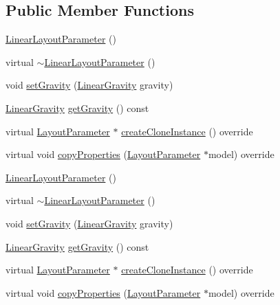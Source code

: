 \subsection*{Public Member Functions}
\begin{DoxyCompactItemize}
\item 
\hyperlink{classui_1_1LinearLayoutParameter_a31ae7f56fcfe826ad8355f654d1e1546}{Linear\+Layout\+Parameter} ()
\item 
virtual \hyperlink{classui_1_1LinearLayoutParameter_a931a53a9e56f1e0dc9527d71928c2fcc}{$\sim$\+Linear\+Layout\+Parameter} ()
\item 
void \hyperlink{classui_1_1LinearLayoutParameter_a5ff8462b69c4e25041cef73621ddc963}{set\+Gravity} (\hyperlink{classui_1_1LinearLayoutParameter_a2045fd6c06860357e95bccdf2531fe08}{Linear\+Gravity} gravity)
\item 
\hyperlink{classui_1_1LinearLayoutParameter_a2045fd6c06860357e95bccdf2531fe08}{Linear\+Gravity} \hyperlink{classui_1_1LinearLayoutParameter_a5950d061c67834f27b76fe3eb272451a}{get\+Gravity} () const
\item 
virtual \hyperlink{classui_1_1LayoutParameter}{Layout\+Parameter} $\ast$ \hyperlink{classui_1_1LinearLayoutParameter_a5f48d9a8e9acb1bea23e15723a3c405a}{create\+Clone\+Instance} () override
\item 
virtual void \hyperlink{classui_1_1LinearLayoutParameter_a8d9e9d1475927a7dcfda3cfe0581f164}{copy\+Properties} (\hyperlink{classui_1_1LayoutParameter}{Layout\+Parameter} $\ast$model) override
\item 
\hyperlink{classui_1_1LinearLayoutParameter_a31ae7f56fcfe826ad8355f654d1e1546}{Linear\+Layout\+Parameter} ()
\item 
virtual \hyperlink{classui_1_1LinearLayoutParameter_a931a53a9e56f1e0dc9527d71928c2fcc}{$\sim$\+Linear\+Layout\+Parameter} ()
\item 
void \hyperlink{classui_1_1LinearLayoutParameter_a5ff8462b69c4e25041cef73621ddc963}{set\+Gravity} (\hyperlink{classui_1_1LinearLayoutParameter_a2045fd6c06860357e95bccdf2531fe08}{Linear\+Gravity} gravity)
\item 
\hyperlink{classui_1_1LinearLayoutParameter_a2045fd6c06860357e95bccdf2531fe08}{Linear\+Gravity} \hyperlink{classui_1_1LinearLayoutParameter_aff9a9ddafe0ba86fb4f196c710d18d98}{get\+Gravity} () const
\item 
virtual \hyperlink{classui_1_1LayoutParameter}{Layout\+Parameter} $\ast$ \hyperlink{classui_1_1LinearLayoutParameter_a90adfb888afd28d7ee8974f5a32afe35}{create\+Clone\+Instance} () override
\item 
virtual void \hyperlink{classui_1_1LinearLayoutParameter_aadf884af74f03c8e31bd832082dfff6f}{copy\+Properties} (\hyperlink{classui_1_1LayoutParameter}{Layout\+Parameter} $\ast$model) override
\end{DoxyCompactItemize}
